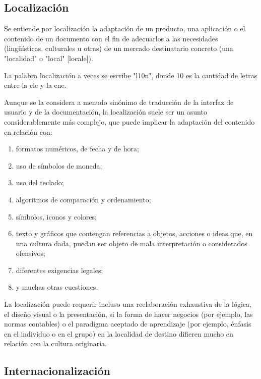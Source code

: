\begin{enumerate}
\subsection{Localización}

Se entiende por localización la adaptación de un producto, una aplicación o el contenido de un documento con el fin de adecuarlos a las necesidades (lingüísticas, culturales u otras) de un mercado destinatario concreto (una "localidad" o "local" [locale]).

\begin{remark}
	La palabra localización a veces se escribe "l10n", donde 10 es la cantidad de letras entre la ele y la ene.
\end{remark}


Aunque se la considera a menudo sinónimo de traducción de la interfaz de usuario y de la documentación, la localización suele ser un asunto considerablemente más complejo, que puede implicar la adaptación del contenido en relación con:

\begin{enumerate}
	\item formatos numéricos, de fecha y de hora;
	\item uso de símbolos de moneda;
	\item uso del teclado;
	\item algoritmos de comparación y ordenamiento;
	\item símbolos, iconos y colores;
	\item texto y gráficos que contengan referencias a objetos, acciones o ideas que, en una cultura dada, puedan ser objeto de mala interpretación o considerados ofensivos;
	\item diferentes exigencias legales;
	\item y muchas otras cuestiones.
\end{enumerate}

La localización puede requerir incluso una reelaboración exhaustiva de la lógica, el diseño visual o la presentación, si la forma de hacer negocios (por ejemplo, las normas contables) o el paradigma aceptado de aprendizaje (por ejemplo, énfasis en el individuo o en el grupo) en la localidad de destino difieren mucho en relación con la cultura originaria.

\subsection{Internacionalización}


\end{enumerate}
